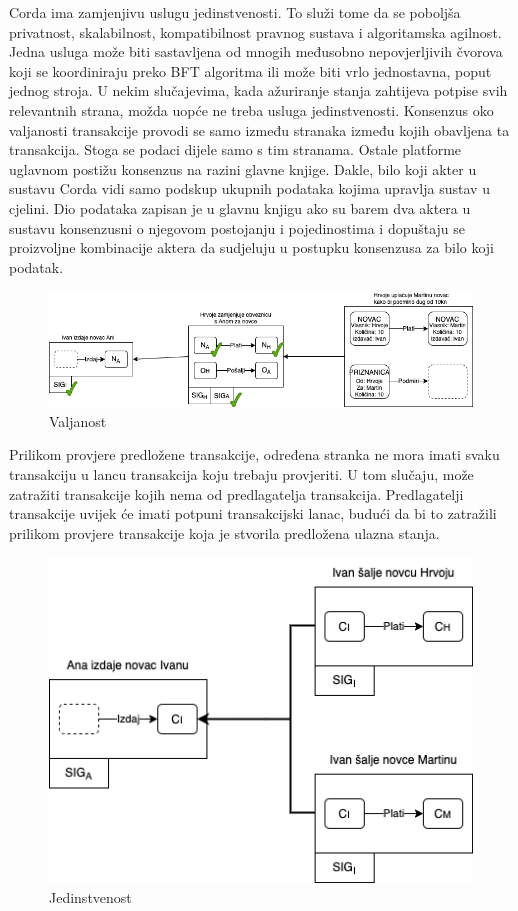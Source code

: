 \documentclass[times, utf8, diplomski]{fer}
\begin{document}
Corda ima zamjenjivu uslugu jedinstvenosti. To služi tome da se poboljša privatnost, skalabilnost, kompatibilnost pravnog sustava i algoritamska agilnost. Jedna usluga može biti sastavljena od mnogih međusobno nepovjerljivih čvorova koji se koordiniraju preko BFT algoritma ili može biti vrlo jednostavna, poput jednog stroja. U nekim slučajevima, kada ažuriranje stanja zahtijeva potpise svih relevantnih strana, možda uopće ne treba usluga jedinstvenosti. Konsenzus oko valjanosti transakcije provodi se samo između stranaka između kojih obavljena ta transakcija. Stoga se podaci dijele samo s tim stranama. Ostale platforme uglavnom postižu konsenzus na razini glavne knjige. Dakle, bilo koji akter u sustavu Corda vidi samo podskup ukupnih podataka kojima upravlja sustav u cjelini. Dio podataka zapisan je u glavnu knjigu ako su barem dva aktera u sustavu konsenzusni o njegovom postojanju i pojedinostima i dopuštaju se proizvoljne kombinacije aktera da sudjeluju u postupku konsenzusa za bilo koji podatak.

\begin{figure}[htb]
\centering
\includegraphics[width=12cm]{imgs/Validity consensus.png}
\caption{Valjanost}
\label{fig:validity}
\end{figure}

Prilikom provjere predložene transakcije, određena stranka ne mora imati svaku transakciju u lancu transakcija koju trebaju provjeriti. U tom slučaju,  može zatražiti transakcije kojih nema od predlagatelja transakcija. Predlagatelji transakcije uvijek će imati potpuni transakcijski lanac, budući da bi to zatražili prilikom provjere transakcije koja je stvorila predložena ulazna stanja.

\begin{figure}[htb]
\centering
\includegraphics[width=12cm]{imgs/Uniqueness consensus.png}
\caption{Jedinstvenost}
\label{fig:uniqueness}
\end{figure}
\end{document}
